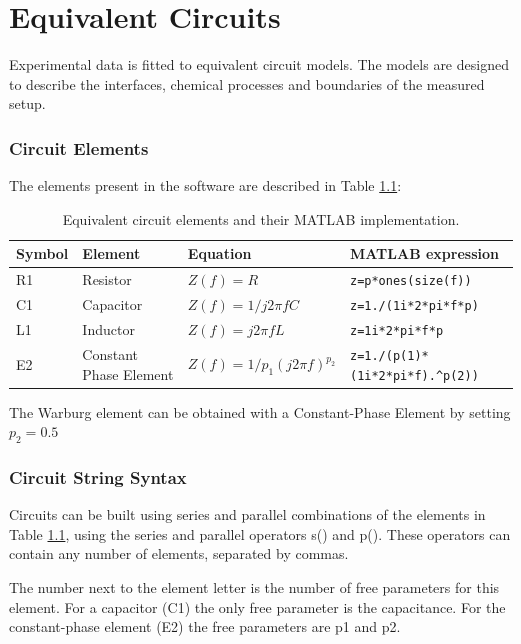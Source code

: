 \documentclass[9pt,a4paper,oneside]{book}
\begin{document}
\chapter{Equivalent Circuits}

Experimental data is fitted to equivalent circuit models. The models are designed to describe the interfaces, chemical processes and boundaries of the measured setup.

\subsection{Circuit Elements}

The elements present in the software are described in Table \ref{circelements}:

\begin{table}[h]
	\centering
	\caption{Equivalent circuit elements and their MATLAB implementation.}
	\label{circelements}
	\begin{tabular}{llll}
		\hline \textbf{Symbol} & \textbf{Element} & \textbf{Equation} & \textbf{MATLAB expression}\\
		\hline R1 & Resistor & $Z(f) = R$ & \verb|z=p*ones(size(f))| \\ 
		C1 & Capacitor & $Z(f) = 1 / j 2\pi fC$ & \verb|z=1./(1i*2*pi*f*p)| \\ 
		L1 & Inductor & $Z(f) = j 2\pi fL$  & \verb|z=1i*2*pi*f*p| \\
		E2 & Constant Phase Element & $Z(f) = 1 / p_1 (j 2 \pi f)^{p_2} $ & \verb|z=1./(p(1)*(1i*2*pi*f).^p(2))| \\
		\hline
	\end{tabular}
\end{table}

The Warburg element can be obtained with a Constant-Phase Element by setting $p_2=0.5$


\subsection{Circuit String Syntax}

Circuits can be built using series and parallel combinations of the elements in Table \ref{circelements}, using the series and parallel operators s() and p(). These operators can contain any number of elements, separated by commas.

The number next to the element letter is the number of free parameters for this element. For a capacitor (C1) the only free parameter is the capacitance. For the constant-phase element (E2) the free parameters are p1 and p2.
\end{document}

